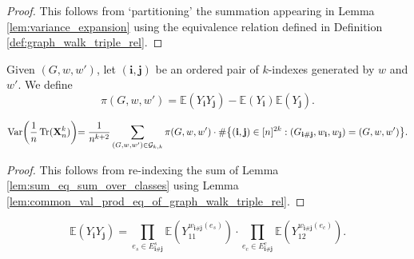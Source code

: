 \begin{proof}
  This follows from `partitioning' the summation appearing in Lemma \ref{lem:variance_expansion} using the equivalence relation defined in Definition \ref{def:graph_walk_triple_rel}.
\end{proof}


\begin{definition}
  \notready
  \label{def:common_val_prod}
  Given $(G,w,w')$, let $(\mathbf{i},\mathbf{j})$ be an ordered pair of $k$-indexes generated by $w$ and $w'$.
  We define
  \[
  \pi(G,w,w') = \mathbb{E}(Y_\mathbf{i} Y_\mathbf{j}) - \mathbb{E}(Y_\mathbf{i}) \mathbb{E}(Y_\mathbf{j}).
  \]
\end{definition}


\begin{lemma}
  \notready
  \label{lem:inner_sum_eq_common_val_prod_mul_card}
  \[
  \text{Var} \biggl(\frac{1}{n} \operatorname{Tr} (\mathbf{X}_n^k) \biggl)
  = \frac{1}{n^{k+2}} \sum_{(G,w,w') \in \mathcal{G}_{k,k}} \pi(G,w,w')
\cdot \# \bigl\{ (\mathbf{i},\mathbf{j}) \in [n]^{2k} : (G_{\mathbf{i} \# \mathbf{j}},w_\mathbf{i},w_\mathbf{j}) = (G,w,w') \bigl\}.
  \]
\end{lemma}

\begin{proof}
  This follows from re-indexing the sum of Lemma \ref{lem:sum_eq_sum_over_classes} using Lemma \ref{lem:common_val_prod_eq_of_graph_walk_triple_rel}.
\end{proof}


\begin{lemma}
  \notready
  \label{lem:expect_mul_eq_prod_expect_edgewise_of_indep}
  \[
  \mathbb{E} (Y_\mathbf{i}Y_\mathbf{j})
  = \prod_{e_s \in E^s_{\mathbf{i} \# \mathbf{j}}} \mathbb{E} (Y_{11}^{w_{\mathbf{i} \# \mathbf{j}}(e_s)}) \cdot \prod_{e_c \in E^c_{\mathbf{i} \# \mathbf{j}}} \mathbb{E} (Y_{12}^{w_{\mathbf{i} \# \mathbf{j}}(e_c)}).
  \]
\end{lemma}

